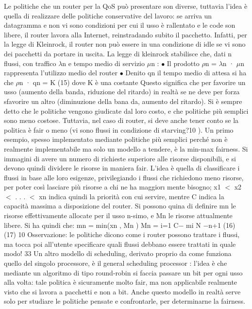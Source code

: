 Le politiche che un router per la QoS può presentare son diverse, tuttavia
l'idea è quella di realizzare delle politiche conservative del lavoro: se arriva un
datagramma e non vi sono condizioni per cui il usso è rallentato e le code son
libere, il router lavora alla Internet, reinstradando subito il pacchetto. Infatti,
per la legge di Kleinrock, il router non può essere in una condizione di idle se
vi sono dei pacchetti da portare in uscita. La legge di kleinrock stabilisce che,
dati n flussi, con traffico $\lambda$n e tempo medio di servizio $\mu$n :
$\bullet$ Il prodotto $\rho$n = $\lambda$n · $\mu$n rappresenta l'utilizzo medio del router
$\bullet$ Denito qn il tempo medio di attesa si ha che
$\rho$n · qn = K
(15)
dove K è una costante
Questo significa che per favorire un usso (aumento della banda, riduzione del
ritardo) in realtà se ne deve per forza sfavorire un altro (diminuzione della bana
da, aumento del ritardo).
Si è sempre detto che le politiche vengono giudicate dal loro costo, e che
politiche più semplici sono meno costose. Tuttavia, nel caso di router, si deve
anche tener conto se la politica è fair o meno (vi sono flussi in condizione di
starving?10 ).
Un primo esempio, spesso implementato mediante politiche più semplici
perché non è realmente implementabile ma solo un modello a tendere, è la
min-max fairness. Si immagini di avere un numero di richieste superiore alle
risorse disponibili, e si devono quindi dividere le risorse in maniera fair. L'idea
è quella di classificare i flussi in base alle loro esigenze, privilegiando i flussi che
richiedono meno risorse, per poter così lasciare più risorse a chi ne ha maggior\i{}
mente bisogno; x1 $<$ x2 $<$ . . . $<$ xn indica quindi la priorità con cui servire,
mentre C indica la capacità massima a disposizione del router. Si possono quina
di definire mn le risorse effettivamente allocate per il usso n-simo, e Mn le
risorse attualmente libere. Si ha quindi che:
mn = min(xn , Mn )
Mn =
i=1
C$-$
mi
N $-$n+1
(16)
(17)
10 Osservazione: le politiche dicono come i router possono trattare i flussi, ma tocca poi
all'utente specificare quali flussi debbano essere trattati in quale modo!
33
Un altro modello di scheduling, derivato proprio da come funziona quello del
singolo processore, è il general scheduling processor : l'idea è che mediante un
algoritmo di tipo round-robin si faccia passare un bit per ogni usso alla volta:
tale politica è sicuramente molto fair, ma non applicabile realmente visto che
si lavora a pacchetti e non a bit. Anche questo modello in realtà serve solo per
studiare le politiche pensate e confrontarle, per determinarne la fairness.
